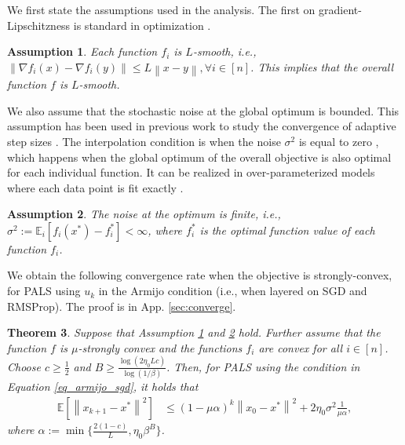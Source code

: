 \documentclass{article}
\newtheorem{theorem}{Theorem}
\newtheorem{lemma}[theorem]{Lemma}
\newtheorem{assumption}[theorem]{Assumption}
\newcommand{\EE}{\mathbb{E}}
\newcommand{\norm}[1]{\left \lVert #1 \right \rVert}
\begin{document}
We first state the assumptions used in the analysis. The first on gradient-Lipschitzness is standard in optimization \citep{bottou2018optimization,vaswani2019painless,loizou2021stochastic,galli2023monotone}.  
\begin{assumption} \label{ass:smooth} Each function $f_i$ is $L$-smooth, i.e., $\norm{\nabla f_i(x) - \nabla f_i(y)} \leq L \norm{x - y}, \forall i \in [n]$. This implies that the overall function $f$ is $L$-smooth. 
\end{assumption}
We also assume that the stochastic noise at the global optimum is bounded. This assumption has been used in previous work to study the convergence of adaptive step sizes \citep{loizou2021stochastic,galli2023monotone,jiang2023adaptive}. The interpolation condition is when the noise $\sigma^2$ is equal to zero \citep{loizou2021stochastic}, which happens when the global optimum of the overall objective is also optimal for each individual function. It can be realized in over-parameterized models where each data point is fit exactly \citep{vaswani2019painless,liu2018accelerating,bassily2018exponential}.
\begin{assumption} \label{ass:noise} The noise at the optimum is finite, i.e., $\sigma^2 := \EE_{i}[f_i(x^*) - f_i^*] < \infty$, where $f_i^*$ is the optimal function value of each function $f_i$.    
\end{assumption}


We obtain the following convergence rate when the objective is strongly-convex, for PALS using $u_k$ in the Armijo condition (i.e., when layered on SGD and RMSProp). The proof is in App. \ref{sec:converge}. 

\begin{theorem} Suppose that Assumption \ref{ass:smooth} and \ref{ass:noise} hold. Further assume that the function $f$ is $\mu$-strongly convex and the functions $f_i$ are convex for all $i \in [n]$. Choose $c \geq \frac{1}{2}$ and $B \geq \frac{\log(2 \eta_0 L c)}{\log(1/\beta)}$. Then, for PALS using the condition in Equation \ref{eq_armijo_sgd}, it holds that
\begin{align*}
    \EE[\norm{x_{k+1}- x^*}^2] 
    &\leq (1 - \mu\alpha)^k \norm{x_{0}- x^*}^2 + 2 \eta_0 \sigma^2 \frac{1}{\mu \alpha}, 
\end{align*}
where $\alpha:=\min\{ \frac{2(1-c)}{L}, \eta_0 \beta^B\}$.     
\end{theorem}
\end{document}
